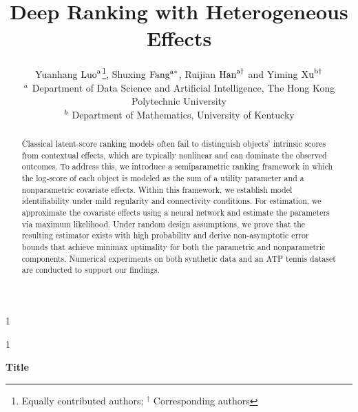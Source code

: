 \documentclass[
  12pt]{article}
\newcommand{\anon}{1}
\begin{document}

\def\spacingset#1{\renewcommand{\baselinestretch}%
{#1}\small\normalsize} \spacingset{1}




\anon
{
  \title{\bf Deep Ranking with Heterogeneous Effects}
  \author{Yuanhang $\rm{Luo}^{a}$\thanks{Equally contributed authors; ${}^{\dagger}$ Corresponding authors},\hspace{0.2cm}
		Shuxing $\rm{Fang}^{a*}$,\hspace{0.2cm}
		Ruijian $\rm{Han}^{a\dagger}$\hspace{0.2cm} and
		Yiming $\rm{Xu}^{b\dagger}$
		\\
		{\small {\small {$\it^{a}$  Department of Data Science and Artificial Intelligence, The Hong Kong Polytechnic University  } }}\\
		{\small {\small {$\it^{b}$ Department of Mathematics, University of Kentucky} }}
	}
  \maketitle
} \fi

\anon
{
  \bigskip
  \bigskip
  \bigskip
  \begin{center}
    {\LARGE\bf Title}
\end{center}
  \medskip
} \fi

\bigskip
\begin{abstract}
Classical latent-score ranking models often fail to distinguish objects' intrinsic scores from contextual effects, which are typically nonlinear and can dominate the observed outcomes. To address this, we introduce a semiparametric ranking framework in which the log-score of each object is modeled as the sum of a utility parameter and a nonparametric covariate effects. Within this framework, we establish model identifiability under mild regularity and connectivity conditions. For estimation, we approximate the covariate effects using a neural network and estimate the parameters via maximum likelihood. Under random design assumptions, we prove that the resulting estimator exists with high probability and derive non-asymptotic error bounds that achieve minimax optimality for both the parametric and nonparametric components. Numerical experiments on both synthetic data and an ATP tennis dataset are conducted to support our findings.
\end{abstract}
\end{document}
